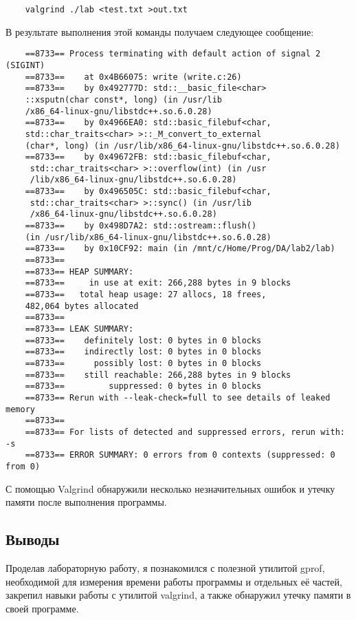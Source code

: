 \documentclass[12pt]{article}
\begin{document}
\begin{lstlisting}
    valgrind ./lab <test.txt >out.txt
\end{lstlisting}

В результате выполнения этой команды получаем следующее сообщение:

\begin{lstlisting}
    ==8733== Process terminating with default action of signal 2 (SIGINT)
    ==8733==    at 0x4B66075: write (write.c:26)
    ==8733==    by 0x492777D: std::__basic_file<char>
    ::xsputn(char const*, long) (in /usr/lib
    /x86_64-linux-gnu/libstdc++.so.6.0.28)
    ==8733==    by 0x4966EA0: std::basic_filebuf<char, 
    std::char_traits<char> >::_M_convert_to_external
    (char*, long) (in /usr/lib/x86_64-linux-gnu/libstdc++.so.6.0.28)
    ==8733==    by 0x49672FB: std::basic_filebuf<char,
     std::char_traits<char> >::overflow(int) (in /usr
     /lib/x86_64-linux-gnu/libstdc++.so.6.0.28)
    ==8733==    by 0x496505C: std::basic_filebuf<char,
     std::char_traits<char> >::sync() (in /usr/lib
     /x86_64-linux-gnu/libstdc++.so.6.0.28)
    ==8733==    by 0x498D7A2: std::ostream::flush() 
    (in /usr/lib/x86_64-linux-gnu/libstdc++.so.6.0.28)
    ==8733==    by 0x10CF92: main (in /mnt/c/Home/Prog/DA/lab2/lab)
    ==8733== 
    ==8733== HEAP SUMMARY:
    ==8733==     in use at exit: 266,288 bytes in 9 blocks
    ==8733==   total heap usage: 27 allocs, 18 frees, 
    482,064 bytes allocated
    ==8733== 
    ==8733== LEAK SUMMARY:
    ==8733==    definitely lost: 0 bytes in 0 blocks
    ==8733==    indirectly lost: 0 bytes in 0 blocks
    ==8733==      possibly lost: 0 bytes in 0 blocks
    ==8733==    still reachable: 266,288 bytes in 9 blocks
    ==8733==         suppressed: 0 bytes in 0 blocks
    ==8733== Rerun with --leak-check=full to see details of leaked memory
    ==8733== 
    ==8733== For lists of detected and suppressed errors, rerun with: -s
    ==8733== ERROR SUMMARY: 0 errors from 0 contexts (suppressed: 0 from 0)
\end{lstlisting}

С помощью Valgrind обнаружили несколько незначительных ошибок и утечку памяти 
после выполнения программы.

\subsection*{Выводы}

Проделав лабораторную работу, я познакомился с полезной утилитой gprof, 
необходимой для измерения времени работы программы и отдельных её частей, 
закрепил навыки работы с утилитой valgrind, а также обнаружил утечку памяти в 
своей программе.
\end{document}
